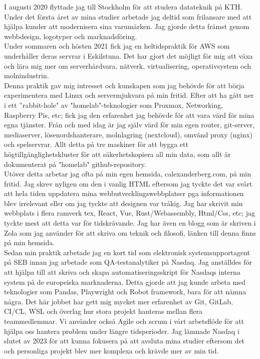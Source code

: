 \documentclass[../main.tex]{subfiles}
\begin{document}
\par
I augusti 2020 flyttade jag till Stockholm för att studera datateknik på KTH. Under det första året av mina studier arbetade jag deltid som frilansare med att hjälpa kunder att modernisera sina varumärken. Jag gjorde detta främst genom webbdesign, logotyper och marknadsföring.
\\

Under sommaren och hösten 2021 fick jag en heltidspraktik för AWS som underhåller deras servrar i Eskilstuna. Det har gjort det möjligt för mig att växa och lära mig mer om serverhårdvara, nätverk, virtualisering, operativsystem och molnindustrin.
\\

Denna praktik gav mig intresset och kunskapen som jag behövde för att börja experimentera med Linux och servermjukvara på min fritid. Efter att ha gått ner i ett ”rabbit-hole" av "homelab"-teknologier som Proxmox, Networking, Raspberry Pis, etc; fick jag den erfarenhet jag behövde för att vara värd för mina egna tjänster. Från och med idag är jag själv värd för min egen router, git-server, mediaserver, lösenordshanterare, molnlagring (nextcloud), omvänd proxy (nginx) och spelservrar. Allt detta på tre maskiner för att bygga ett högtillgänglighetskluster för att säkerhetskopiera all min data, som allt är dokumenterat på "homelab" github-repository.
\\

Utöver detta arbetar jag ofta på min egen hemsida, calexanderberg.com, på min fritid. Jag skrev nyligen om den i vanlig HTML eftersom jag tyckte det var svårt att hela tiden uppdatera mina webbutvecklingswebbplatser pga informationen blev irrelevant eller om jag tyckte att designen var tråkig. Jag har skrivit min webbplats i flera ramverk tex, React, Vue, Rust/Webassembly, Html/Css, etc; jag tyckte mest att detta var för tidskrävande. Jag har även en blogg som är skriven i Zola som jag använder för att skriva om teknik och filosofi, länken till denna finns på min hemsida.
\\

Sedan min praktik arbetade jag en kort tid som elektronisk systemsupportagent på SEB innan jag arbetade som QA-testanalytiker på Nasdaq. Jag anställdes för att hjälpa till att skriva och skapa automatiseringsskript för Nasdaqs interna system på de europeiska marknaderna. Detta gjorde att jag kunde arbeta med teknologier som Pandas, Playwright och Robot framework, bara för att nämna några. Det här jobbet har gett mig mycket mer erfarenhet av Git, GitLab, CI/CL, WSL och överlag hur stora projekt hanteras mellan flera teammedlemmar. Vi använder också Agile och scrum i vårt arbetsflöde för att hjälpa oss hantera problem under längre tidsperioder. Jag lämnade Nasdaq i slutet av 2023 för att kunna fokusera på att avsluta mina studier eftersom det och personliga projekt blev mer komplexa och krävde mer av min tid.
\\
\end{document}
